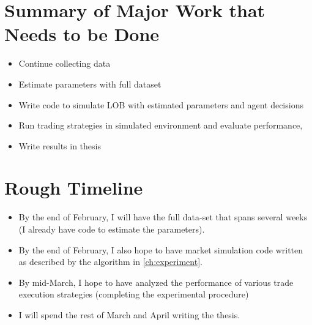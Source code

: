\section{Summary of Major Work that Needs to be Done}
\begin{itemize}
\item Continue collecting data
\item Estimate parameters with full dataset
\item Write code to simulate LOB with estimated parameters and agent decisions
\item Run trading strategies in simulated environment and evaluate performance,
\item Write results in thesis
\end{itemize}

\section{Rough Timeline}
\begin{itemize}
\item By the end of February, I will have the full data-set that spans several weeks (I already have code to estimate the parameters).
\item By the end of February, I also hope to have market simulation code written as described by the algorithm in \ref{ch:experiment}.
\item By mid-March, I hope to have analyzed the performance of various trade execution strategies (completing the experimental procedure)
\item I will spend the rest of March and April writing the thesis.
\end{itemize}
